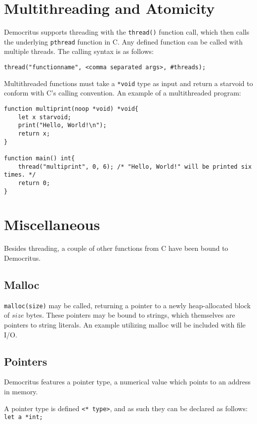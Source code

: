 \section{Multithreading and Atomicity}
	Democritus supports threading with the \texttt{thread()} function call, which then calls the underlying \texttt{pthread} function in C. Any defined function can be called with multiple threads. The calling syntax is as follows:
	\begin{lstlisting}
thread("functionname", <comma separated args>, #threads);
	\end{lstlisting}

	\noindent
	Multithreaded functions must take a \texttt{*void} type as input and return a starvoid to conform with C's calling convention. An example of a multithreaded program:

	\begin{lstlisting}
function multiprint(noop *void) *void{
	let x starvoid;
	print("Hello, World!\n");
	return x;
}

function main() int{
	thread("multiprint", 0, 6); /* "Hello, World!" will be printed six times. */
	return 0;
}

	\end{lstlisting}



\section{Miscellaneous}
	Besides threading, a couple of other functions from C have been bound to Democritus.

	\subsection{Malloc}
		\texttt{malloc(size)} may be called, returning a pointer to a newly heap-allocated block of $size$ bytes. These pointers may be bound to strings, which themselves are pointers to string literals. An example utilizing malloc will be included with file I/O.

	\subsection{Pointers}

		Democritus features a pointer type, a numerical value which points to an address in memory. 

		\medskip\noindent A pointer type is defined \verb|<* type>|, and as such they can be declared as follows: \verb| let a *int;|	
		
